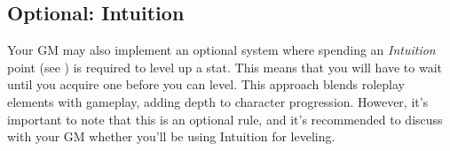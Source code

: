 \documentclass[../main.tex]{subfiles}
\begin{document}
    \subsection{Optional: Intuition}
    
    Your GM may also implement an optional system where spending an \emph{Intuition} point (see {}) is required to level up a stat. This means that you will have to wait until you acquire one before you can level. This approach blends roleplay elements with gameplay, adding depth to character progression. However, it's important to note that this is an optional rule, and it's recommended to discuss with your GM whether you'll be using Intuition for leveling.
\end{document}
